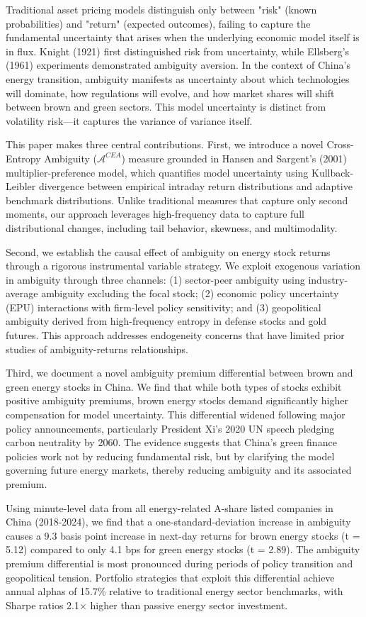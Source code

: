 \documentclass[preprint,12pt,authoryear]{elsarticle}
\begin{document}
Traditional asset pricing models distinguish only between "risk" (known probabilities) and "return" (expected outcomes), failing to capture the fundamental uncertainty that arises when the underlying economic model itself is in flux. Knight (1921) first distinguished risk from uncertainty, while Ellsberg's (1961) experiments demonstrated ambiguity aversion. In the context of China's energy transition, ambiguity manifests as uncertainty about which technologies will dominate, how regulations will evolve, and how market shares will shift between brown and green sectors. This model uncertainty is distinct from volatility risk—it captures the variance of variance itself.

This paper makes three central contributions. First, we introduce a novel Cross-Entropy Ambiguity ($\mathcal{A}^{CEA}$) measure grounded in Hansen and Sargent's (2001) multiplier-preference model, which quantifies model uncertainty using Kullback-Leibler divergence between empirical intraday return distributions and adaptive benchmark distributions. Unlike traditional measures that capture only second moments, our approach leverages high-frequency data to capture full distributional changes, including tail behavior, skewness, and multimodality.

Second, we establish the causal effect of ambiguity on energy stock returns through a rigorous instrumental variable strategy. We exploit exogenous variation in ambiguity through three channels: (1) sector-peer ambiguity using industry-average ambiguity excluding the focal stock; (2) economic policy uncertainty (EPU) interactions with firm-level policy sensitivity; and (3) geopolitical ambiguity derived from high-frequency entropy in defense stocks and gold futures. This approach addresses endogeneity concerns that have limited prior studies of ambiguity-returns relationships.

Third, we document a novel ambiguity premium differential between brown and green energy stocks in China. We find that while both types of stocks exhibit positive ambiguity premiums, brown energy stocks demand significantly higher compensation for model uncertainty. This differential widened following major policy announcements, particularly President Xi's 2020 UN speech pledging carbon neutrality by 2060. The evidence suggests that China's green finance policies work not by reducing fundamental risk, but by clarifying the model governing future energy markets, thereby reducing ambiguity and its associated premium.

Using minute-level data from all energy-related A-share listed companies in China (2018-2024), we find that a one-standard-deviation increase in ambiguity causes a 9.3 basis point increase in next-day returns for brown energy stocks (t = 5.12) compared to only 4.1 bps for green energy stocks (t = 2.89). The ambiguity premium differential is most pronounced during periods of policy transition and geopolitical tension. Portfolio strategies that exploit this differential achieve annual alphas of 15.7\% relative to traditional energy sector benchmarks, with Sharpe ratios 2.1× higher than passive energy sector investment.
\end{document}
